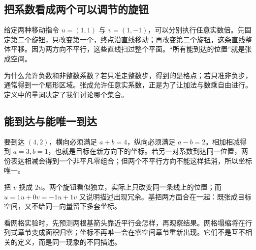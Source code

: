 \subsection*{把系数看成两个可以调节的旋钮}
给定两种移动指令 $u=(1,1)$ 与 $v=(1,-1)$，可以分别执行任意实数倍。先固定第二个旋钮，只改变第一个，终点沿直线移动；再改变第二个旋钮，这条直线整体平移。因为两方向不平行，这些直线扫过整个平面。“所有能到达的位置”就是张成空间。

为什么允许负数和非整数系数？若只准走整数步，得到的是格点；若只准非负步，通常得到一个扇形区域。张成允许任意实系数，正是为了让加法与数乘自由进行。定义中的量词决定了我们讨论哪个集合。

\subsection*{能到达与能唯一到达}
要到达 $(4,2)$，横向必须满足 $a+b=4$，纵向必须满足 $a-b=2$。相加相减得到 $a=3,b=1$，也就是目标在新方向下的坐标。若另一对系数到达同一位置，两份表达相减会得到一个非平凡零组合；但两个不平行方向不能这样抵消，所以坐标唯一。

把 $v$ 换成 $2u$。两个旋钮看似独立，实际上只改变同一条线上的位置；而 $u=1u+0v=-1u+1v$ 又说明描述出现冗余。基把两方面合在一起：既张成目标空间，又不给同一向量留下多套坐标。

看网格实验时，先预测两根基箭头靠近平行会怎样，再观察结果。网格塌缩将在行列式章节变成面积归零；坐标不再唯一会在零空间章节重新出现。它们不是互不相关的定义，而是同一现象的不同描述。
